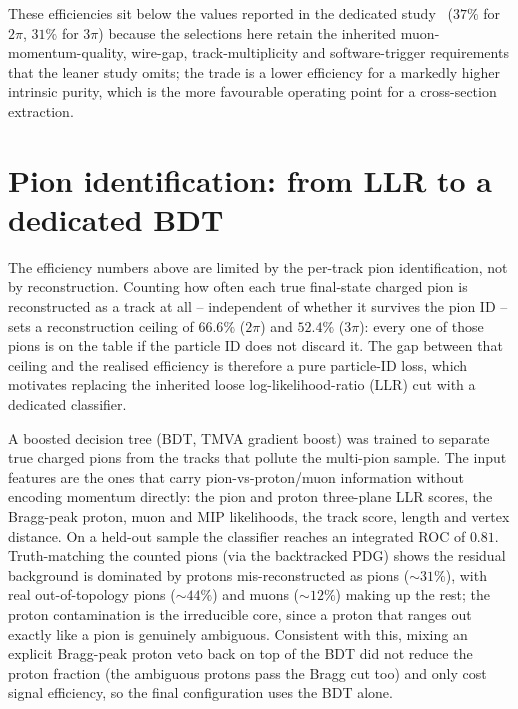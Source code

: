 \documentclass[11pt,a4paper]{article}
\begin{document}
These efficiencies sit below the values reported in the dedicated
study~\cite{mahmud} ($37\%$ for $2\pi$, $31\%$ for $3\pi$) because the selections here
retain the inherited muon-momentum-quality, wire-gap, track-multiplicity and
software-trigger requirements that the leaner study omits; the trade is a lower
efficiency for a markedly higher intrinsic purity, which is the more favourable operating
point for a cross-section extraction.

\section{Pion identification: from LLR to a dedicated BDT}
\label{sec:bdt}

The efficiency numbers above are limited by the per-track pion identification, not by
reconstruction. Counting how often each true final-state charged pion is reconstructed as
a track at all -- independent of whether it survives the pion ID -- sets a reconstruction
ceiling of $66.6\%$ ($2\pi$) and $52.4\%$ ($3\pi$): every one of those pions is on the table
if the particle ID does not discard it. The gap between that ceiling and the realised
efficiency is therefore a pure particle-ID loss, which motivates replacing the inherited
loose log-likelihood-ratio (LLR) cut with a dedicated classifier.

A boosted decision tree (BDT, TMVA gradient boost) was trained to separate true charged
pions from the tracks that pollute the multi-pion sample. The input features are the ones
that carry pion-vs-proton/muon information without encoding momentum directly: the pion
and proton three-plane LLR scores, the Bragg-peak proton, muon and MIP likelihoods, the
track score, length and vertex distance. On a held-out sample the classifier reaches an
integrated ROC of $0.81$. Truth-matching the counted pions (via the backtracked PDG)
shows the residual background is dominated by protons mis-reconstructed as pions
($\sim 31\%$), with real out-of-topology pions ($\sim 44\%$) and muons ($\sim 12\%$) making
up the rest; the proton contamination is the irreducible core, since a proton that ranges
out exactly like a pion is genuinely ambiguous. Consistent with this, mixing an explicit
Bragg-peak proton veto back on top of the BDT did not reduce the proton fraction (the
ambiguous protons pass the Bragg cut too) and only cost signal efficiency, so the final
configuration uses the BDT alone.
\end{document}
